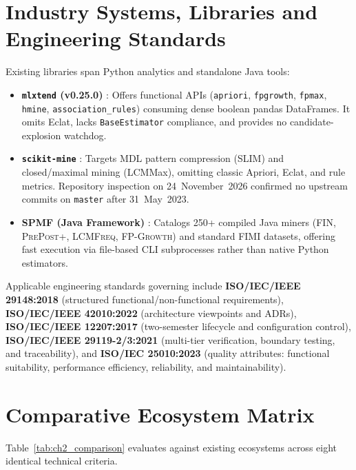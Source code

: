 \section{Industry Systems, Libraries and Engineering Standards}
Existing libraries span Python analytics and standalone Java tools:
\begin{itemize}
  \item \textbf{\texttt{mlxtend} (v0.25.0)} \cite{mlxtend}: Offers functional APIs (\texttt{apriori}, \texttt{fpgrowth}, \texttt{fpmax}, \texttt{hmine}, \texttt{association\_\protect\allowbreak{}rules}) consuming dense boolean pandas DataFrames. It omits Eclat, lacks \texttt{BaseEstimator} compliance, and provides no candidate-explosion watchdog.
  \item \textbf{\texttt{scikit-mine}} \cite{scikitmine}: Targets MDL pattern compression (SLIM) and closed/maximal mining (LCMMax), omitting classic Apriori, Eclat, and rule metrics. Repository inspection on 24~November~2026 confirmed no upstream commits on \texttt{master} after 31~May~2023.
  \item \textbf{SPMF (Java Framework)} \cite{spmf}: Catalogs 250+ compiled Java miners (\textsc{FIN}, \textsc{PrePost+}, \textsc{LCMFreq}, \textsc{FP-Growth}) and standard FIMI datasets, offering fast execution via file-based CLI subprocesses rather than native Python estimators.
\end{itemize}

Applicable engineering standards governing \skarm include \textbf{ISO/IEC/IEEE 29148:2018} (structured functional/non-functional requirements), \textbf{ISO/IEC/IEEE 42010:2022} (architecture viewpoints and ADRs), \textbf{ISO/IEC/IEEE 12207:2017} (two-semester lifecycle and configuration control), \textbf{ISO/IEC/IEEE 29119-2/3:2021} (multi-tier verification, boundary testing, and traceability), and \textbf{ISO/IEC 25010:2023} (quality attributes: functional suitability, performance efficiency, reliability, and maintainability).

\section{Comparative Ecosystem Matrix}
Table~\ref{tab:ch2_comparison} evaluates \skarm against existing ecosystems across eight identical technical criteria.


